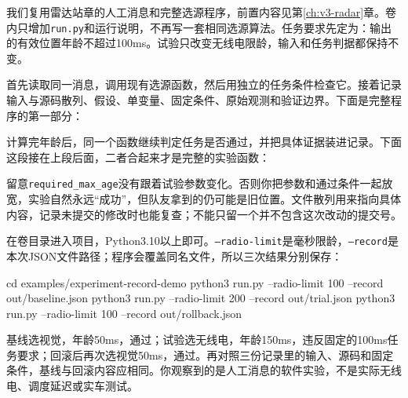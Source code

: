 \begin{example}
我们复用雷达站章的人工消息和完整选源程序，前置内容见第\ref{ch:v3-radar}章。卷内只增加\texttt{run.py}和运行说明，不再写一套相同选源算法。任务要求先定为：输出的有效位置年龄不超过100ms。试验只改变无线电限龄，输入和任务判据都保持不变。

首先读取同一消息，调用现有选源函数，然后用独立的任务条件检查它。接着记录输入与源码散列、假设、单变量、固定条件、原始观测和验证边界。下面是完整程序的第一部分：

\par\vspace{6pt}
\noindent\begin{minipage}[t]{\linewidth}

\end{minipage}\par\vspace{6pt}
计算完年龄后，同一个函数继续判定任务是否通过，并把具体证据装进记录。下面这段接在上段后面，二者合起来才是完整的实验函数：

\par\vspace{6pt}
\noindent\begin{minipage}[t]{\linewidth}

\end{minipage}\par\vspace{6pt}
留意\texttt{required\_max\_age}没有跟着试验参数变化。否则你把参数和通过条件一起放宽，实验自然永远“成功”，但队友拿到的仍可能是旧位置。文件散列用来指向具体内容，记录未提交的修改时也能复查；不能只留一个并不包含这次改动的提交号。

\par\vspace{6pt}
\noindent\begin{minipage}[t]{\linewidth}

\end{minipage}\par\vspace{6pt}
在卷目录进入项目，Python3.10以上即可。\texttt{--radio-limit}是毫秒限龄，\texttt{--record}是本次JSON文件路径；程序会覆盖同名文件，所以三次结果分别保存：
\begin{tbash}
cd examples/experiment-record-demo
python3 run.py --radio-limit 100 --record out/baseline.json
python3 run.py --radio-limit 200 --record out/trial.json
python3 run.py --radio-limit 100 --record out/rollback.json
\end{tbash}
基线选视觉，年龄50ms，通过；试验选无线电，年龄150ms，违反固定的100ms任务要求；回滚后再次选视觉50ms，通过。再对照三份记录里的输入、源码和固定条件，基线与回滚内容应相同。你观察到的是人工消息的软件实验，不是实际无线电、调度延迟或实车测试。
\end{example}

